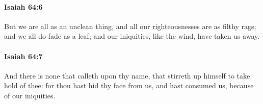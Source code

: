 		\paragraph{Isaiah 64:6} %
			\label{ISAIAH-64-6}

			But we are all as an unclean thing, and all our righteousnesses are as filthy rags; and we all do fade as a leaf; and our iniquities, like the wind, have taken us away.


		\paragraph{Isaiah 64:7} %
			\label{ISAIAH-64-7}

			And there is none that calleth upon thy name, that stirreth up himself to take hold of thee: for thou hast hid thy face from us, and hast consumed us, because of our iniquities.


